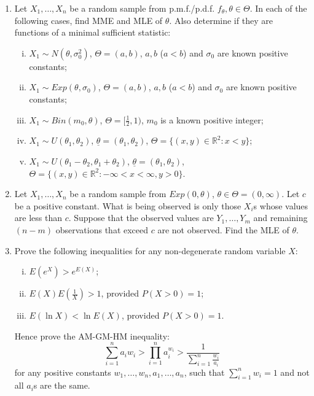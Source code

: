 \documentclass[11pt]{article}
\begin{document}
\begin{enumerate}
    \item Let $X_{1}, \dots, X_{n}$ be a random sample from p.m.f./p.d.f. $f_{\theta}, \theta \in \Theta$. In each of the following cases, find MME and MLE of $\theta$. Also determine if they are functions of a minimal sufficient statistic:
    \begin{enumerate}[(i)]
        \item $X_{1} \sim N(\theta, \sigma_{0}^{2})$, $\Theta = (a, b)$, $a, b$ ($a < b$) and $\sigma_{0}$ are known positive constants;
        \item $X_{1} \sim Exp(\theta, \sigma_{0})$, $\Theta = (a, b)$, $a, b$ ($a < b$) and $\sigma_{0}$ are known positive constants;
        \item $X_{1} \sim Bin(m_{0}, \theta)$, $\Theta = [\frac{1}{2}, 1)$, $m_{0}$ is a known positive integer;
        \item $X_{1} \sim U(\theta_{1}, \theta_{2})$, $\underline{\theta} = (\theta_{1}, \theta_{2})$, $\Theta = \{(x, y) \in \mathbb{R}^{2} : x < y\}$;
        \item $X_{1} \sim U(\theta_{1} - \theta_{2}, \theta_{1} + \theta_{2})$, $\underline{\theta} = (\theta_{1}, \theta_{2})$, $\Theta = \{(x, y) \in \mathbb{R}^{2} : -\infty < x < \infty, y > 0\}$.
    \end{enumerate}

    \item Let $X_{1}, \dots, X_{n}$ be a random sample from $Exp(0, \theta)$, $\theta \in \Theta = (0, \infty)$. Let $c$ be a positive constant. What is being observed is only those $X_{i}$s whose values are less than $c$. Suppose that the observed values are $Y_{1}, \dots, Y_{m}$ and remaining $(n - m)$ observations that exceed $c$ are not observed. Find the MLE of $\theta$.

    \item Prove the following inequalities for any non-degenerate random variable $X$: 
    \begin{enumerate}[(i)]
        \item $E(e^{X}) > e^{E(X)}$; 
        \item $E(X) E(\frac{1}{X}) > 1$, provided $P(X > 0) = 1$;
        \item $E(\ln X) < \ln E(X)$, provided $P(X > 0) = 1$. 
    \end{enumerate}
    Hence prove the AM-GM-HM inequality:
    \[ \sum_{i=1}^{n} a_{i} w_{i} > \prod_{i=1}^{n} a_{i}^{w_{i}} > \frac{1}{\sum_{i=1}^{n} \frac{w_{i}}{a_{i}}} \]
    for any positive constants $w_{1}, \dots, w_{n}, a_{1}, \dots, a_{n}$, such that $\sum_{i=1}^{n} w_{i} = 1$ and not all $a_{i}$s are the same.


\end{enumerate}
\end{document}

